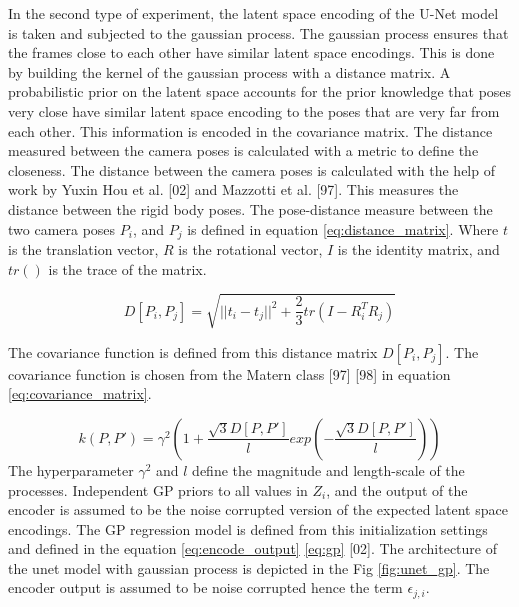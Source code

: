     In the second type of experiment, the latent space encoding of the U-Net model is taken and subjected to the gaussian process. The gaussian process ensures that the frames close to each other have similar latent space encodings. This is done by building the kernel of the gaussian process with a distance matrix. A probabilistic prior on the latent space accounts for the prior knowledge that poses very close have similar latent space encoding to the poses that are very far from each other. This information is encoded in the covariance matrix. The distance measured between the camera poses is calculated with a metric to define the closeness. The distance between the camera poses is calculated with the help of work by Yuxin Hou et al. [02] and Mazzotti et al. [97]. This measures the distance between the rigid body poses. The pose-distance measure between the two camera poses $P_i$, and $P_j$ is defined in equation \ref{eq:distance_matrix}. Where $t$ is the translation vector, $R$ is the rotational vector, $I$ is the identity matrix, and $tr()$ is the trace of the matrix.  
    
    \begin{equation}
     D[P_i, P_j] = \sqrt{{||t_i - t_j||}^2 + \frac{2}{3} tr(I - R_i^TR_j)}
     \label{eq:distance_matrix}    
    \end{equation}
	
	The covariance function is defined from this distance matrix $D[P_i, P_j]$. The covariance function is chosen from the Matern class [97] [98] in equation \ref{eq:covariance_matrix}.  
	
	\begin{equation}
		k(P,P') = \gamma^2(1+\frac{\sqrt{3}D[P,P']}{l}exp(-\frac{\sqrt{3}D[P,P']}{l}))
		\label{eq:covariance_matrix}
	\end{equation}
	The hyperparameter $\gamma^2$ and $l$ define the magnitude and length-scale of the processes. Independent GP priors to all values in $Z_i$, and the output of the encoder is assumed to be the noise corrupted version of the expected latent space encodings. The GP regression model is defined from this initialization settings and defined in the equation \ref{eq:encode_output} \ref{eq:gp} [02]. The architecture of the unet model with gaussian process is depicted in the Fig \ref{fig:unet_gp}. The encoder output is assumed to be noise corrupted hence the term $\epsilon_{j,i}$. 


